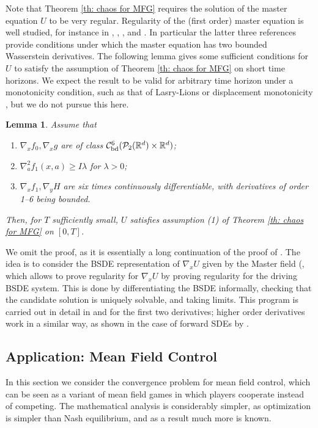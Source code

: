 \documentclass[11pt,reqno]{amsart}
\numberwithin{equation}{section}
\newtheorem{lemma}[theorem]{Lemma}
\theoremstyle{definition}
\def\R{{\mathbb R}}
\begin{document}
Note that Theorem \ref{th: chaos for MFG} requires the solution of the master equation $U$ to be very regular. Regularity of the (first order) master equation is well studied, for instance in \cite{DelarueClassical}, \cite{PorettaRegularityME}, \cite{MasterEquation}, and \cite[Section 5]{CDMFGbook2}. In particular the latter three references provide conditions under which the master equation has two bounded Wasserstein derivatives. The following lemma gives some sufficient conditions for $U$ to satisfy the assumption of Theorem \ref{th: chaos for MFG} on short time horizons.  We expect the result to be valid for arbitrary time horizon under a monotonicity condition, such as that of Lasry-Lions \cite{lasry2007mean} or displacement monotonicity \cite{gangbo2022mean}, but we do not pursue this here. 



\begin{lemma}
\label{lm: smoothness of MasterEq}
Assume that
    \begin{enumerate}
        \item $\nabla_x f_0,\nabla_x g$ are of class $\mathcal C_{\textup{bd}}^{6}(\mathcal P_2(\R^d)\times \R^d)$;
        \item $\nabla_a^2 f_1(x,a)\geq I\lambda$ for $\lambda>0$;
        \item $\nabla_x f_1,\nabla_y H$ are six times continuously differentiable, with derivatives of order 1--6 being bounded.
    \end{enumerate}
    Then, for $T$ sufficiently small, $U$ satisfies assumption (1) of Theorem \ref{th: chaos for MFG} on $[0,T]$.
\end{lemma}

We omit the proof, as it is essentially a long continuation of the proof of \cite[Theorem 5.49]{CDMFGbook2}. The idea is to consider the BSDE representation of $\nabla_x U$ given by the Master field (\cite[Section 4]{CDMFGbook2}, which allows to prove regularity for $\nabla_x U$ by proving regularity for the driving BSDE system. This is done by differentiating the BSDE informally, checking that the candidate solution is uniquely solvable, and taking limits. This program is carried out in detail in \cite{DelarueClassical} and \cite[Section 5]{CDMFGbook2} for the first two derivatives; higher order derivatives work in a similar way, as shown in the case of forward SDEs by \cite{Chassagneux2022-jt}.

\subsection{Application: Mean Field Control}
In this section we consider the convergence problem for mean field control, which can be seen as a variant of  mean field games in which players cooperate instead of competing. The mathematical analysis is considerably simpler, as optimization is simpler than Nash equilibrium, and as a result much more is known.
\end{document}
